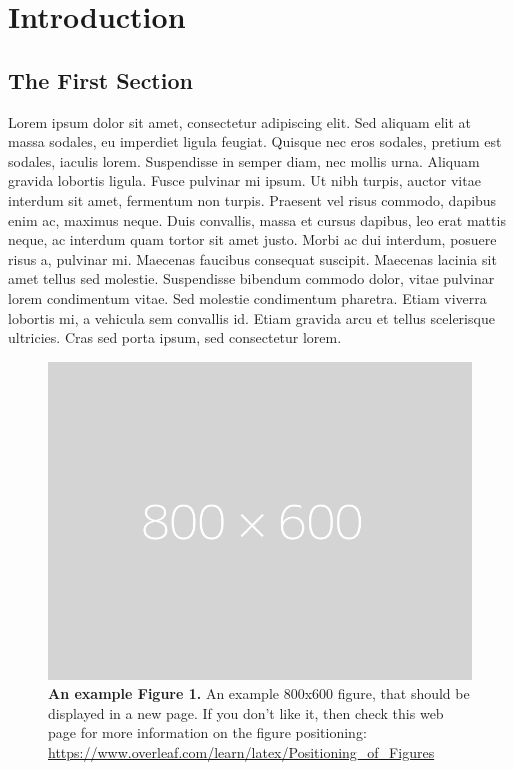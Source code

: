 
\chapter{Introduction}
\section{The First Section}
Lorem ipsum dolor sit amet\cite{einstein,latexcompanion,knuthwebsite}, consectetur adipiscing elit. Sed aliquam elit at massa sodales, eu imperdiet ligula feugiat. Quisque nec eros sodales, pretium est sodales, iaculis lorem. Suspendisse in semper diam, nec mollis urna. Aliquam gravida lobortis ligula. Fusce pulvinar mi ipsum. Ut nibh turpis, auctor vitae interdum sit amet, fermentum non turpis. Praesent vel risus commodo, dapibus enim ac, maximus neque. Duis convallis, massa et cursus dapibus, leo erat mattis neque, ac interdum quam tortor sit amet justo. Morbi ac dui interdum, posuere risus a, pulvinar mi. Maecenas faucibus consequat suscipit. Maecenas lacinia sit amet tellus sed molestie. Suspendisse bibendum commodo dolor, vitae pulvinar lorem condimentum vitae. Sed molestie condimentum pharetra. Etiam viverra lobortis mi, a vehicula sem convallis id. Etiam gravida arcu et tellus scelerisque ultricies. Cras sed porta ipsum, sed consectetur lorem.

\begin{figure}[p]
    \centering
    \includegraphics[width=\textwidth]{figures/placeholder.png}
    \caption[An example Figure 1.]{\textbf{An example Figure 1.} An example 800x600 figure, that should be displayed in a new page. If you don't like it, then check this web page for more information on the figure positioning: \href{https://www.overleaf.com/learn/latex/Positioning_of_Figures}{https://www.overleaf.com/learn/latex/Positioning\_of\_Figures}}
    \label{figlabel1}
\end{figure}

